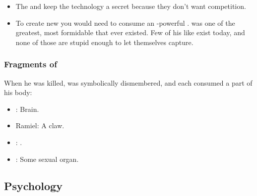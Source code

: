 \begin{itemize}
  \item 
    The \satharioth{} and \banelords{} keep the technology a secret because they don't want competition. 
  \item
    To create new \satharioth{} you would need to consume an \uber-powerful \vertex{}. 
    \Nexagglachel{} was one of the greatest, most formidable \dragons{} that ever existed. 
    Few of his like exist today, and none of those are stupid enough to let themselves capture. 
\end{itemize}





\subsubsection{Fragments of \Nexagglachel}
When he was killed,  was symbolically dismembered, and each \sathariah{} consumed a part of his body: 

\begin{itemize}
  \item \Azraid: Brain.
  \item Ramiel: A claw. 
  \item \Shiaraid: . 
  \item \Zachirah: Some sexual organ. 
\end{itemize}











\subsection{Psychology}





\subsubsection{\NexagglachelsCurse}

